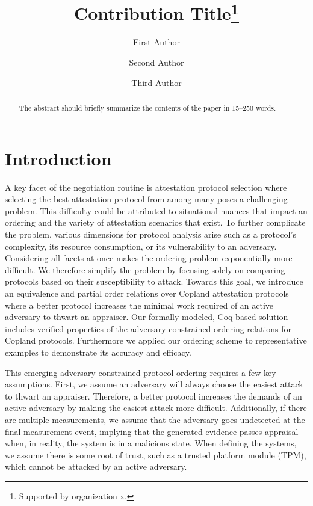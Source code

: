 \documentclass[runningheads]{llncs}
\theoremstyle{definition}
\begin{document}
%
\title{Contribution Title\thanks{Supported by organization x.}}
%
%
\author{First Author \and
Second Author \and
Third Author}
%
%
%
\maketitle              %
%
\begin{abstract}
The abstract should briefly summarize the contents of the paper in
15--250 words.

\end{abstract}
%
%
%
\section{Introduction}
A key facet of the negotiation routine is attestation protocol selection where selecting the best attestation protocol from among many poses a challenging problem. This difficulty could be attributed to situational nuances that impact an ordering and the variety of attestation scenarios that exist. To further complicate the problem, various dimensions for protocol analysis arise such as a protocol's complexity, its resource consumption, or its vulnerability to an adversary. Considering all facets at once makes the ordering problem exponentially more difficult. We therefore simplify the problem by focusing solely on comparing protocols based on their susceptibility to attack. Towards this goal, we introduce an equivalence and partial order relations over Copland attestation protocols where a better protocol increases the minimal work required of an active adversary to thwart an appraiser. Our formally-modeled, Coq-based solution includes verified properties of the adversary-constrained ordering relations for Copland protocols. Furthermore we applied our ordering scheme to representative examples to demonstrate its accuracy and efficacy.

This emerging adversary-constrained protocol ordering requires a few key assumptions. First, we assume an adversary will always choose the easiest attack to thwart an appraiser. Therefore, a better protocol increases the demands of an active adversary by making the easiest attack more difficult. Additionally, if there are multiple measurements, we assume that the adversary goes undetected at the final measurement event, implying that the generated evidence passes appraisal when, in reality, the system is in a malicious state. When defining the systems, we assume there is some root of trust, such as a trusted platform module (TPM), which cannot be attacked by an active adversary.
\end{document}
